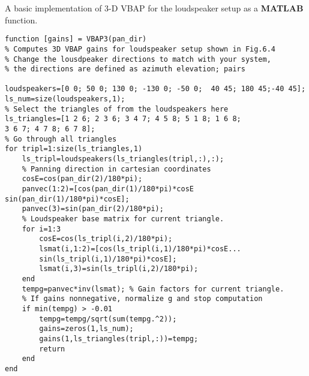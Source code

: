 \documentclass[10pt,a4paper,oneside]{article}
\begin{document}
 A basic implementation of 3-D VBAP for the loudspeaker setup as a {\bfseries MATLAB} function.
 \begin{lstlisting}
function [gains] = VBAP3(pan_dir)
% Computes 3D VBAP gains for loudspeaker setup shown in Fig.6.4 
% Change the lousdpeaker directions to match with your system, 
% the directions are defined as azimuth elevation; pairs
 
loudspeakers=[0 0; 50 0; 130 0; -130 0; -50 0;  40 45; 180 45;-40 45];
ls_num=size(loudspeakers,1);
% Select the triangles of from the loudspeakers here
ls_triangles=[1 2 6; 2 3 6; 3 4 7; 4 5 8; 5 1 8; 1 6 8;
3 6 7; 4 7 8; 6 7 8];
% Go through all triangles
for tripl=1:size(ls_triangles,1)
	ls_tripl=loudspeakers(ls_triangles(tripl,:),:);
 	% Panning direction in cartesian coordinates
	cosE=cos(pan_dir(2)/180*pi);
	panvec(1:2)=[cos(pan_dir(1)/180*pi)*cosE sin(pan_dir(1)/180*pi)*cosE];
 	panvec(3)=sin(pan_dir(2)/180*pi);
 	% Loudspeaker base matrix for current triangle.
 	for i=1:3
 		cosE=cos(ls_tripl(i,2)/180*pi);
 		lsmat(i,1:2)=[cos(ls_tripl(i,1)/180*pi)*cosE...
 		sin(ls_tripl(i,1)/180*pi)*cosE];
		lsmat(i,3)=sin(ls_tripl(i,2)/180*pi);
	end
	tempg=panvec*inv(lsmat); % Gain factors for current triangle.
	% If gains nonnegative, normalize g and stop computation
	if min(tempg) > -0.01
		tempg=tempg/sqrt(sum(tempg.^2));
		gains=zeros(1,ls_num);
		gains(1,ls_triangles(tripl,:))=tempg;
		return
	end
end
 
 \end{lstlisting}
\end{document}
